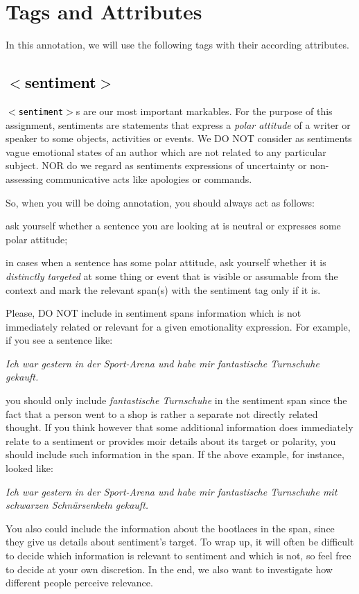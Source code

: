 \documentclass[11pt,a4paper]{article}
\newenvironment{example}{\begin{center}\begin{exe}\ex}{\end{exe}\end{center}}
\newcommand{\xmltag}[1]{\textcolor{black}{{\small$<$#1$>$}}}
\renewenvironment{example}{\begin{center}\itshape}{\upshape\end{center}}
\begin{document}

\section{Tags and Attributes}
In this annotation, we will use the following tags with their according
attributes.

\subsection{\xmltag{sentiment}}
\texttt{\xmltag{sentiment}}s are our most important markables. For the
purpose of this assignment, sentiments are statements that express a
\emph{polar attitude} of a writer or speaker to some objects,
activities or events. We DO NOT consider as sentiments vague emotional
states of an author which are not related to any particular subject.
NOR do we regard as sentiments expressions of uncertainty or
non-assessing communicative acts like apologies or commands.

So, when you will be doing annotation, you should always act as
follows:
\begin{inparaenum}[1)]
\item ask yourself whether a sentence you are looking at is
neutral or expresses some polar attitude;
\item in cases when a sentence has some polar attitude, ask yourself
  whether it is \emph{distinctly targeted} at some thing or event that
  is visible or assumable from the context and mark the relevant
  span(s) with the sentiment tag only if it is.
\end{inparaenum}

Please, DO NOT include in sentiment spans information which is not
immediately related or relevant for a given emotionality expression.
For example, if you see a sentence like:
\begin{example}
Ich war gestern in der Sport-Arena und habe mir fantastische Turnschuhe gekauft.
\end{example}
you should only include \textit{fantastische Turnschuhe} in the
sentiment span since the fact that a person went to a shop is rather a
separate not directly related thought. If you think however that some
additional information does immediately relate to a sentiment or
provides moir details about its target or polarity, you should include
such information in the span. If the above example, for instance,
looked like:
\begin{example}
Ich war gestern in der Sport-Arena und habe mir fantastische
Turnschuhe mit schwarzen Schn\"ursenkeln gekauft.
\end{example}
You also could include the information about the bootlaces in the
span, since they give us details about sentiment's target.  To wrap
up, it will often be difficult to decide which information is relevant
to sentiment and which is not, so feel free to decide at your own
discretion.  In the end, we also want to investigate how different
people perceive relevance.
\end{document}
